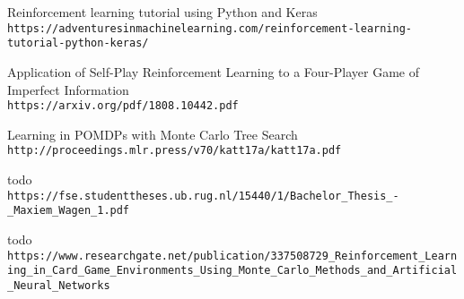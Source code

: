 \documentclass[11pt]{article}
\begin{document}
\begin{thebibliography}{9}
Reinforcement learning tutorial using Python and Keras 
\\\texttt{https://adventuresinmachinelearning.com/reinforcement-learning-tutorial-python-keras/}

Application of Self-Play Reinforcement Learning to a Four-Player Game of Imperfect Information
\\\texttt{https://arxiv.org/pdf/1808.10442.pdf}

Learning in POMDPs with Monte Carlo Tree Search
\\\texttt{http://proceedings.mlr.press/v70/katt17a/katt17a.pdf}

todo
\\\texttt{https://fse.studenttheses.ub.rug.nl/15440/1/Bachelor_Thesis_-_Maxiem_Wagen_1.pdf}

todo
\\\texttt{https://www.researchgate.net/publication/337508729_Reinforcement_Learning_in_Card_Game_Environments_Using_Monte_Carlo_Methods_and_Artificial_Neural_Networks}
\end{thebibliography}
\end{document}
